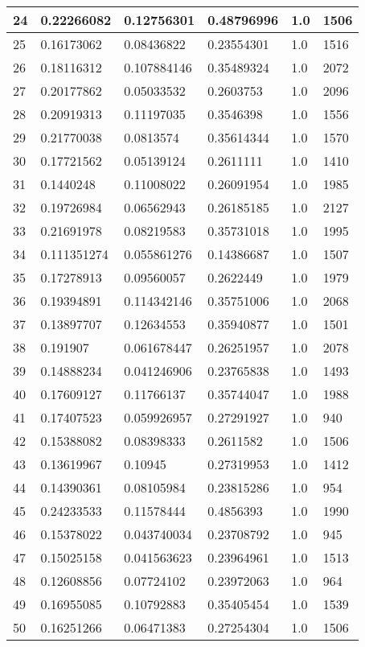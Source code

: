\begin{longtable}{|l|l|l|l|l|l|}
24 & 0.22266082 & 0.12756301 & 0.48796996 & 1.0 & 1506 \\ \hline 
25 & 0.16173062 & 0.08436822 & 0.23554301 & 1.0 & 1516 \\ \hline 
26 & 0.18116312 & 0.107884146 & 0.35489324 & 1.0 & 2072 \\ \hline 
27 & 0.20177862 & 0.05033532 & 0.2603753 & 1.0 & 2096 \\ \hline 
28 & 0.20919313 & 0.11197035 & 0.3546398 & 1.0 & 1556 \\ \hline 
29 & 0.21770038 & 0.0813574 & 0.35614344 & 1.0 & 1570 \\ \hline 
30 & 0.17721562 & 0.05139124 & 0.2611111 & 1.0 & 1410 \\ \hline 
31 & 0.1440248 & 0.11008022 & 0.26091954 & 1.0 & 1985 \\ \hline 
32 & 0.19726984 & 0.06562943 & 0.26185185 & 1.0 & 2127 \\ \hline 
33 & 0.21691978 & 0.08219583 & 0.35731018 & 1.0 & 1995 \\ \hline 
34 & 0.111351274 & 0.055861276 & 0.14386687 & 1.0 & 1507 \\ \hline 
35 & 0.17278913 & 0.09560057 & 0.2622449 & 1.0 & 1979 \\ \hline 
36 & 0.19394891 & 0.114342146 & 0.35751006 & 1.0 & 2068 \\ \hline 
37 & 0.13897707 & 0.12634553 & 0.35940877 & 1.0 & 1501 \\ \hline 
38 & 0.191907 & 0.061678447 & 0.26251957 & 1.0 & 2078 \\ \hline 
39 & 0.14888234 & 0.041246906 & 0.23765838 & 1.0 & 1493 \\ \hline 
40 & 0.17609127 & 0.11766137 & 0.35744047 & 1.0 & 1988 \\ \hline 
41 & 0.17407523 & 0.059926957 & 0.27291927 & 1.0 & 940 \\ \hline 
42 & 0.15388082 & 0.08398333 & 0.2611582 & 1.0 & 1506 \\ \hline 
43 & 0.13619967 & 0.10945 & 0.27319953 & 1.0 & 1412 \\ \hline 
44 & 0.14390361 & 0.08105984 & 0.23815286 & 1.0 & 954 \\ \hline 
45 & 0.24233533 & 0.11578444 & 0.4856393 & 1.0 & 1990 \\ \hline 
46 & 0.15378022 & 0.043740034 & 0.23708792 & 1.0 & 945 \\ \hline 
47 & 0.15025158 & 0.041563623 & 0.23964961 & 1.0 & 1513 \\ \hline 
48 & 0.12608856 & 0.07724102 & 0.23972063 & 1.0 & 964 \\ \hline 
49 & 0.16955085 & 0.10792883 & 0.35405454 & 1.0 & 1539 \\ \hline 
50 & 0.16251266 & 0.06471383 & 0.27254304 & 1.0 & 1506 \\ \hline 
\end{longtable}
